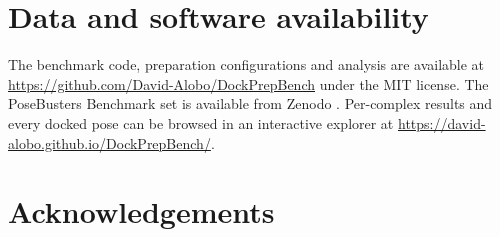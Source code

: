 \section*{Data and software availability}

The benchmark code, preparation configurations and analysis are available at
\url{https://github.com/David-Alobo/DockPrepBench} under the MIT license.  The PoseBusters Benchmark set is
available from Zenodo \citep{posebusters2023data}. Per-complex results and every docked
pose can be browsed in an interactive explorer at
\url{https://david-alobo.github.io/DockPrepBench/}.

\section*{Acknowledgements}

